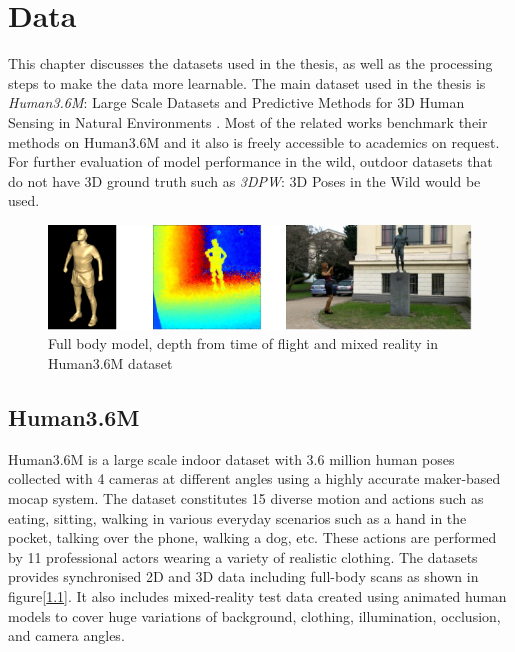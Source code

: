 \chapter{Data}
\label{chap:data}
This chapter discusses the datasets used in the thesis, as well as the processing steps to make the data more learnable. The main dataset used in the thesis is \textit{Human3.6M}: Large Scale Datasets and Predictive Methods for 3D Human Sensing in Natural Environments \cite{H3.6}. Most of the related works benchmark their methods on Human3.6M and it also is freely accessible to academics on request. For further evaluation of model performance in the wild, outdoor datasets that do not have 3D ground truth such as \textit{3DPW}: 3D Poses in the Wild \cite{3dpw} would be used.

\begin{figure}[h]
    \centering
    \includegraphics[width=\textwidth]{figures/h36/modlities.png}
    \caption{Full body model, depth from time of flight and mixed reality in Human3.6M dataset}
    \label{fig:h36_modality}
\end{figure}

\section{Human3.6M}
Human3.6M is a large scale indoor dataset with 3.6 million human poses collected with 4 cameras at different angles using a highly accurate maker-based \ac{mocap} system. The dataset constitutes 15 diverse motion and actions such as eating, sitting, walking in various everyday scenarios such as a hand in the pocket, talking over the phone, walking a dog, etc. These actions are performed by 11 professional actors wearing a variety of realistic clothing. The datasets provides synchronised 2D and 3D data including full-body scans as shown in figure[\ref{fig:h36_modality}]. It also includes mixed-reality test data created using animated human models to cover huge variations of background, clothing, illumination, occlusion, and camera angles.


